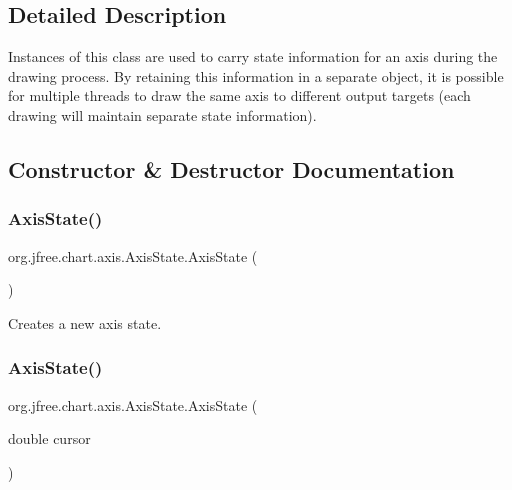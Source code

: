 \subsection{Detailed Description}
Instances of this class are used to carry state information for an axis during the drawing process. By retaining this information in a separate object, it is possible for multiple threads to draw the same axis to different output targets (each drawing will maintain separate state information). 

\subsection{Constructor \& Destructor Documentation}
\mbox{\label{classorg_1_1jfree_1_1chart_1_1axis_1_1_axis_state_a6209c8f3a5eb8e3d5f03f82c5fec590d}} 
\subsubsection{\texorpdfstring{Axis\+State()}{AxisState()}\hspace{0.1cm}{\footnotesize\ttfamily [1/2]}}
{\footnotesize\ttfamily org.\+jfree.\+chart.\+axis.\+Axis\+State.\+Axis\+State (\begin{DoxyParamCaption}{ }\end{DoxyParamCaption})}

Creates a new axis state. \mbox{\label{classorg_1_1jfree_1_1chart_1_1axis_1_1_axis_state_a58e9c4ba6dd03ebcb78610200d698c7b}} 
\subsubsection{\texorpdfstring{Axis\+State()}{AxisState()}\hspace{0.1cm}{\footnotesize\ttfamily [2/2]}}
{\footnotesize\ttfamily org.\+jfree.\+chart.\+axis.\+Axis\+State.\+Axis\+State (\begin{DoxyParamCaption}\item[{double}]{cursor }\end{DoxyParamCaption})}

